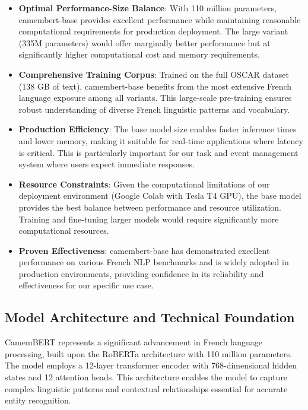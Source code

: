 \documentclass[12pt,a4paper]{article}
\begin{document}
\begin{itemize}
    \item \textbf{Optimal Performance-Size Balance}: With 110 million parameters, camembert-base provides excellent performance while maintaining reasonable computational requirements for production deployment. The large variant (335M parameters) would offer marginally better performance but at significantly higher computational cost and memory requirements.
    
    \item \textbf{Comprehensive Training Corpus}: Trained on the full OSCAR dataset (138 GB of text), camembert-base benefits from the most extensive French language exposure among all variants. This large-scale pre-training ensures robust understanding of diverse French linguistic patterns and vocabulary.
    
    \item \textbf{Production Efficiency}: The base model size enables faster inference times and lower memory, making it suitable for real-time applications where latency is critical. This is particularly important for our task and event management system where users expect immediate responses.
    
    \item \textbf{Resource Constraints}: Given the computational limitations of our deployment environment (Google Colab with Tesla T4 GPU), the base model provides the best balance between performance and resource utilization. Training and fine-tuning larger models would require significantly more computational resources.
    
    \item \textbf{Proven Effectiveness}: camembert-base has demonstrated excellent performance on various French NLP benchmarks and is widely adopted in production environments, providing confidence in its reliability and effectiveness for our specific use case.
\end{itemize}


\subsection{Model Architecture and Technical Foundation}

CamemBERT represents a significant advancement in French language processing, built upon the RoBERTa architecture with 110 million parameters. The model employs a 12-layer transformer encoder with 768-dimensional hidden states and 12 attention heads. This architecture enables the model to capture complex linguistic patterns and contextual relationships essential for accurate entity recognition.
\end{document}
